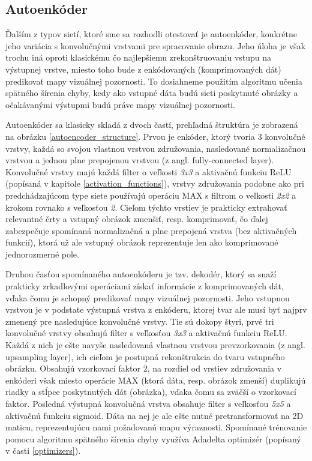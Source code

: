 \subsection{Autoenkóder}
\label{autoencoder_design}
Ďalším z typov sietí, ktoré sme sa rozhodli otestovať je autoenkóder, konkrétne jeho variácia s konvolučnými vrstvami pre spracovanie obrazu. Jeho úloha je však trochu iná oproti klasickému čo najlepšiemu zrekonštruovaniu vstupu na výstupnej vrstve, miesto toho bude z enkódovaných (komprimovaných dát) predikovať mapy vizuálnej pozornosti. To dosiahneme použitím algoritmu učenia spätného šírenia chyby, kedy ako vstupné dáta budú sieti poskytnuté obrázky a očakávanými výstupmi budú práve mapy vizuálnej pozornosti.

Autoenkóder sa klasicky skladá z dvoch častí, prehľadná štruktúra je zobrazená na obrázku \ref{autoencoder_structure}. Prvou je enkóder, ktorý tvoria 3 konvolučné vrstvy, každá so svojou vlastnou vrstvou združovania, nasledované normalizačnou vrstvou a jednou plne prepojenou vrstvou (z angl. fully-connected layer). Konvolučné vrstvy majú každá filter o veľkosti \textit{3x3} a aktivačnú funkciu ReLU (popísaná v kapitole \ref{activation_functions}), vrstvy združovania podobne ako pri predchádzajúcom type siete používajú operáciu MAX s filtrom o veľkosti \textit{2x2} a krokom rovnako s veľkosťou \textit{2}. Cieľom týchto vrstiev je prakticky extrahovať relevantné črty a vstupný obrázok zmenšiť, resp. komprimovať, čo ďalej zabezpečuje spomínaná normalizačná a plne prepojená vrstva (bez aktivačných funkcií), ktorá už ale vstupný obrázok reprezentuje len ako komprimované jednorozmerné pole. 

Druhou časťou spomínaného autoenkóderu je tzv. dekodér, ktorý sa snaží prakticky zrkadlovými operáciami získať informácie z komprimovaných dát, vďaka čomu je schopný predikovať mapy vizuálnej pozornosti. Jeho vstupnou vrstvou je v podstate výstupná vrstva z enkóderu, ktorej tvar ale musí byť najprv zmenený pre nasledujúce konvolučné vrstvy. Tie sú dokopy štyri, prvé tri konvolučné vrstvy obsahujú filter s veľkosťou \textit{3x3} a aktivačnú funkciu ReLU. Každá z nich je ešte navyše nasledovaná vlastnou vrstvou
prevzorkovania (z angl. upsampling layer), ich cieľom je postupná rekonštrukcia do tvaru vstupného obrázku. Obsahujú vzorkovací faktor 2, na rozdiel od vrstiev združovania v enkóderi však miesto operácie MAX (ktorá dáta, resp. obrázok zmenší) duplikujú riadky a stĺpce poskytnutých dát (obrázka), vďaka čomu sa zväčší o vzorkovací faktor. Posledná výstupná konvolučná vrstva obsahuje filter s veľkosťou \textit{5x5} a aktivačnú funkciu sigmoid. Dáta na nej je ale ešte nutné pretransformovať na 2D maticu, reprezentujúcu nami požadovanú mapu výraznosti. Spomínané trénovanie pomocu algoritmu spätného šírenia chyby využíva Adadelta optimizér (popísaný v časti \ref{optimizers}).

